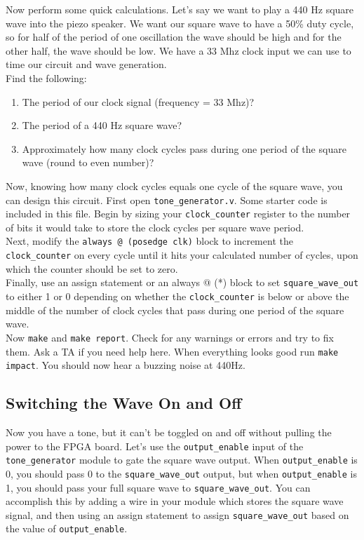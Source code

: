 \documentclass[11pt]{article}
\begin{document}
Now perform some quick calculations. Let's say we want to play a 440 Hz square wave into the piezo speaker. We want our square wave to have a 50\% duty cycle, so for half of the period of one oscillation the wave should be high and for the other half, the wave should be low. We have a 33 Mhz clock input we can use to time our circuit and wave generation. \\

Find the following:
\begin{enumerate}
	\item The period of our clock signal (frequency = 33 Mhz)?
	\item The period of a 440 Hz square wave?
	\item Approximately how many clock cycles pass during one period of the square wave (round to even number)?
\end{enumerate}

Now, knowing how many clock cycles equals one cycle of the square wave, you can design this circuit. First open \verb|tone_generator.v|. Some starter code is included in this file. Begin by sizing your \verb|clock_counter| register to the number of bits it would take to store the clock cycles per square wave period.\\

Next, modify the \verb|always @ (posedge clk)| block to increment the \verb|clock_counter| on every cycle until it hits your calculated number of cycles, upon which the counter should be set to zero.\\

Finally, use an assign statement or an always @ (*) block to set \verb|square_wave_out| to either 1 or 0 depending on whether the \verb|clock_counter| is below or above the middle of the number of clock cycles that pass during one period of the square wave.\\

Now \verb|make| and \verb|make report|. Check for any warnings or errors and try to fix them. Ask a TA if you need help here. When everything looks good run \verb|make impact|. You should now hear a buzzing noise at 440Hz.

\subsection{Switching the Wave On and Off}
Now you have a tone, but it can't be toggled on and off without pulling the power to the FPGA board. Let's use the \verb|output_enable| input of the \verb|tone_generator| module to gate the square wave output. When \verb|output_enable| is 0, you should pass 0 to the \verb|square_wave_out| output, but when \verb|output_enable| is 1, you should pass your full square wave to \verb|square_wave_out|. You can accomplish this by adding a wire in your module which stores the square wave signal, and then using an assign statement to assign \verb|square_wave_out| based on the value of \verb|output_enable|.
\end{document}
